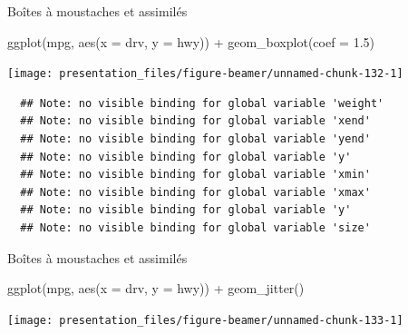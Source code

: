 \documentclass[12pt,ignorenonframetext,handout,]{beamer}
\newenvironment{Shaded}{}{}
\newcommand{\DataTypeTok}[1]{#1}
\newcommand{\FloatTok}[1]{#1}
\newcommand{\KeywordTok}[1]{\textcolor[rgb]{0.00,0.00,1.00}{#1}}
\newcommand{\NormalTok}[1]{#1}
\newcommand{\OperatorTok}[1]{#1}
\newcommand{\StringTok}[1]{\textcolor[rgb]{0.00,0.50,0.50}{#1}}
\renewenvironment{Shaded}{\begin{snugshade}}{\end{snugshade}}
\begin{document}
\begin{frame}[fragile]{Boîtes à moustaches et assimilés}
\protect\hypertarget{boites-a-moustaches-et-assimiles}{}

\footnotesize \center

\begin{Shaded}
\begin{Highlighting}[]
\KeywordTok{ggplot}\NormalTok{(mpg, }\KeywordTok{aes}\NormalTok{(}\DataTypeTok{x =}\NormalTok{ drv, }\DataTypeTok{y =}\NormalTok{ hwy)) }\OperatorTok{+}\StringTok{ }
\StringTok{  }\KeywordTok{geom_boxplot}\NormalTok{(}\DataTypeTok{coef =} \FloatTok{1.5}\NormalTok{)}
\end{Highlighting}
\end{Shaded}

\texttt{[image: presentation\_files/figure-beamer/unnamed-chunk-132-1]}

\begin{verbatim}
  ## Note: no visible binding for global variable 'weight' 
  ## Note: no visible binding for global variable 'xend' 
  ## Note: no visible binding for global variable 'yend' 
  ## Note: no visible binding for global variable 'y' 
  ## Note: no visible binding for global variable 'xmin' 
  ## Note: no visible binding for global variable 'xmax' 
  ## Note: no visible binding for global variable 'y' 
  ## Note: no visible binding for global variable 'size'
\end{verbatim}

\end{frame}

\begin{frame}[fragile]{Boîtes à moustaches et assimilés}
\protect\hypertarget{boites-a-moustaches-et-assimiles-1}{}

\footnotesize \center

\begin{Shaded}
\begin{Highlighting}[]
\KeywordTok{ggplot}\NormalTok{(mpg, }\KeywordTok{aes}\NormalTok{(}\DataTypeTok{x =}\NormalTok{ drv, }\DataTypeTok{y =}\NormalTok{ hwy)) }\OperatorTok{+}\StringTok{ }
\StringTok{  }\KeywordTok{geom_jitter}\NormalTok{()}
\end{Highlighting}
\end{Shaded}

\texttt{[image: presentation\_files/figure-beamer/unnamed-chunk-133-1]}

\end{frame}
\end{document}
